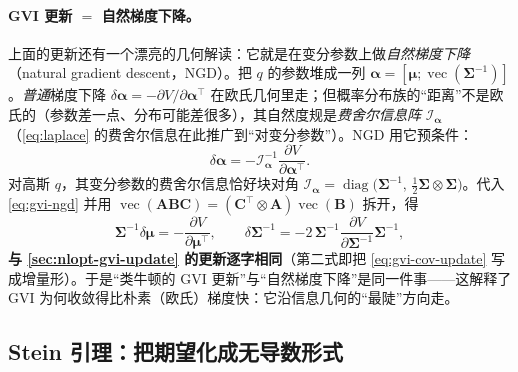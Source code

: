 \paragraph{GVI 更新 $=$ 自然梯度下降。}
上面的更新还有一个漂亮的几何解读：它就是在变分参数上做\emph{自然梯度下降}（natural gradient descent，NGD）\cite{amari1998natural}。把 $q$ 的参数堆成一列 $\boldsymbol{\alpha}=[\boldsymbol{\mu};\operatorname{vec}(\boldsymbol{\Sigma}^{-1})]$。\emph{普通}梯度下降 $\delta\boldsymbol{\alpha}=-\partial V/\partial\boldsymbol{\alpha}^\top$ 在欧氏几何里走；但概率分布族的“距离”不是欧氏的（参数差一点、分布可能差很多），其自然度规是\emph{费舍尔信息阵} $\boldsymbol{\mathcal{I}}_{\boldsymbol{\alpha}}$（\cref{eq:laplace} 的费舍尔信息在此推广到“对变分参数”）。NGD 用它预条件：
\begin{equation}
  \delta\boldsymbol{\alpha}=-\boldsymbol{\mathcal{I}}_{\boldsymbol{\alpha}}^{-1}\frac{\partial V}{\partial\boldsymbol{\alpha}^\top}.
  \label{eq:gvi-ngd}
\end{equation}
对高斯 $q$，其变分参数的费舍尔信息恰好块对角 $\boldsymbol{\mathcal{I}}_{\boldsymbol{\alpha}}=\operatorname{diag}\!\big(\boldsymbol{\Sigma}^{-1},\,\tfrac12\boldsymbol{\Sigma}\otimes\boldsymbol{\Sigma}\big)$。代入 \cref{eq:gvi-ngd} 并用 $\operatorname{vec}(\mathbf{A}\mathbf{B}\mathbf{C})=(\mathbf{C}^\top\otimes\mathbf{A})\operatorname{vec}(\mathbf{B})$ 拆开，得
\begin{equation}
  \boldsymbol{\Sigma}^{-1}\delta\boldsymbol{\mu}=-\frac{\partial V}{\partial\boldsymbol{\mu}^\top},\qquad
  \delta\boldsymbol{\Sigma}^{-1}=-2\,\boldsymbol{\Sigma}^{-1}\frac{\partial V}{\partial\boldsymbol{\Sigma}^{-1}}\boldsymbol{\Sigma}^{-1},
  \label{eq:gvi-ngd-components}
\end{equation}
\textbf{与 \cref{sec:nlopt-gvi-update} 的更新逐字相同}（第二式即把 \cref{eq:gvi-cov-update} 写成增量形）。于是“类牛顿的 GVI 更新”与“自然梯度下降”是同一件事——这解释了 GVI 为何收敛得比朴素（欧氏）梯度快：它沿信息几何的“最陡”方向走。

\subsection{Stein 引理：把期望化成无导数形式}
\label{sec:nlopt-gvi-stein}


